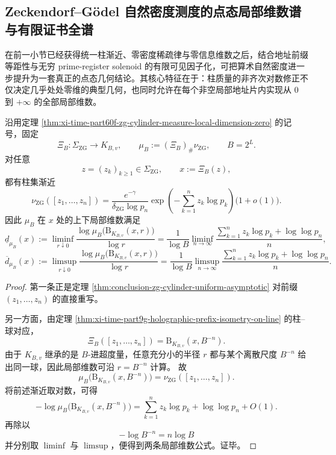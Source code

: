 \subsection{Zeckendorf--Gödel 自然密度测度的点态局部维数谱与有限证书全谱}\label{subsec:conclusion-zg-density-pointwise-spectrum-finite-certificate}
在前一小节已经获得统一柱渐近、零密度稀疏律与零信息维数之后，结合地址前缀等距性与无穷 prime-register solenoid 的有限可见因子化，可把算术自然密度进一步提升为一套真正的点态几何结论。其核心特征在于：柱质量的非齐次对数修正不仅决定几乎处处零维的典型几何，也同时允许在每个非空局部地址片内实现从 \(0\) 到 \(+\infty\) 的全部局部维数。

\begin{theorem}[算术自然密度测度的点态柱渐近与局部维数公式]\label{thm:conclusion-zg-pointwise-local-dimension-formula}
沿用定理 \ref{thm:xi-time-part60f-zg-cylinder-measure-local-dimension-zero} 的记号，固定
\[
\Xi_B:\Sigma_{\mathrm{ZG}}\to K_{B,v},
\qquad
\mu_B:=(\Xi_B)_\#\nu_{\mathrm{ZG}},
\qquad
B=2^L.
\]
对任意
\[
z=(z_k)_{k\ge 1}\in \Sigma_{\mathrm{ZG}},
\qquad
x:=\Xi_B(z),
\]
都有柱集渐近
\[
\nu_{\mathrm{ZG}}([z_1,\dots,z_n])
=
\frac{e^{-\gamma}}{\delta_{\mathrm{ZG}}\log p_n}
\exp\!\left(-\sum_{k=1}^{n}z_k\log p_k\right)
\bigl(1+o(1)\bigr).
\]
因此 \(\mu_B\) 在 \(x\) 处的上下局部维数满足
\[
\underline d_{\mu_B}(x)
:=
\liminf_{r\downarrow 0}
\frac{\log \mu_B\!\bigl(\mathrm B_{K_{B,v}}(x,r)\bigr)}{\log r}
=
\frac{1}{\log B}
\liminf_{n\to\infty}
\frac{\sum_{k=1}^{n}z_k\log p_k+\log\log p_n}{n},
\]
\[
\overline d_{\mu_B}(x)
:=
\limsup_{r\downarrow 0}
\frac{\log \mu_B\!\bigl(\mathrm B_{K_{B,v}}(x,r)\bigr)}{\log r}
=
\frac{1}{\log B}
\limsup_{n\to\infty}
\frac{\sum_{k=1}^{n}z_k\log p_k+\log\log p_n}{n}.
\]
\end{theorem}
\begin{proof}
第一条正是定理 \ref{thm:conclusion-zg-cylinder-uniform-asymptotic} 对前缀
\(
(z_1,\dots,z_n)
\)
的直接重写。

另一方面，由定理 \ref{thm:xi-time-part9g-holographic-prefix-isometry-on-line} 的柱--球对应，
\[
\Xi_B([z_1,\dots,z_n])
=
\mathrm B_{K_{B,v}}(x,B^{-n}).
\]
由于 \(K_{B,v}\) 继承的是 \(B\)-进超度量，任意充分小的半径 \(r\) 都与某个离散尺度 \(B^{-n}\) 给出同一球，因此局部维数可沿 \(r=B^{-n}\) 计算。
故
\[
\mu_B\!\bigl(\mathrm B_{K_{B,v}}(x,B^{-n})\bigr)
=
\nu_{\mathrm{ZG}}([z_1,\dots,z_n]).
\]
将前述渐近取对数，可得
\[
-\log \mu_B\!\bigl(\mathrm B_{K_{B,v}}(x,B^{-n})\bigr)
=
\sum_{k=1}^{n}z_k\log p_k+\log\log p_n+O(1).
\]
再除以
\[
-\log B^{-n}=n\log B
\]
并分别取 \(\liminf\) 与 \(\limsup\)，便得到两条局部维数公式。证毕。
\end{proof}

